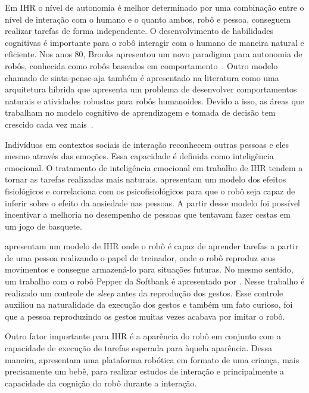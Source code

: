 Em IHR o nível de autonomia é melhor determinado por uma combinação entre o nível de interação com o humano e o quanto ambos, robô e pessoa, conseguem realizar tarefas de forma independente. O desenvolvimento de habilidades cognitivas é importante para o robô interagir com o humano de maneira natural e eficiente. Nos anos 80, Brooks apresentou um novo paradigma para autonomia de robôs, conhecida como robôs baseados em comportamento~\cite{brooks:1986, brooks:1991}. Outro modelo chamado de sinta-pense-aja também é apresentado na literatura como uma arquitetura híbrida que apresenta um problema de desenvolver comportamentos naturais e atividades robustas para robôs humanoides. Devido a isso, as áreas que trabalham no modelo cognitivo de aprendizagem e tomada de decisão tem crescido cada vez mais~\cite{goodrich:2007}.

Indivíduos em contextos sociais de interação reconhecem outras pessoas e eles mesmo através das emoções. Essa capacidade é definida como inteligência emocional. O tratamento de inteligência emocional em trabalho de IHR tendem a tornar as tarefas realizadas mais naturais. \textcite{rani:2006} apresentam um modelo dos efeitos fisiológicos e correlaciona com os psicofisiológicos para que o robô seja capaz de inferir sobre o efeito da ansiedade nas pessoas. A partir desse modelo foi possível incentivar a melhoria no desempenho de pessoas que tentavam fazer cestas em um jogo de basquete.

\textcite{giovannangeli:2007} apresentam um modelo de IHR onde o robô é capaz de aprender tarefas a partir de uma pessoa realizando o papel de treinador, onde o robô reproduz seus movimentos e consegue armazená-lo para situações futuras. No mesmo sentido, um trabalho com o robô Pepper da Softbank é apresentado por \textcite{kitagawa:2016}. Nesse trabalho é realizado um controle de \emph{sleep} antes da reprodução dos gestos. Esse controle auxiliou na naturalidade da execução dos gestos e também um fato curioso, foi que a pessoa reproduzindo os gestos muitas vezes acabava por imitar o robô.

Outro fator importante para IHR é a aparência do robô em conjunto com a capacidade de execução de tarefas esperada para àquela aparência. Dessa maneira, \textcite{minato:2007} apresentam uma plataforma robótica em formato de uma criança, mais precisamente um bebê, para realizar estudos de interação e principalmente a capacidade da cognição do robô durante a interação.

